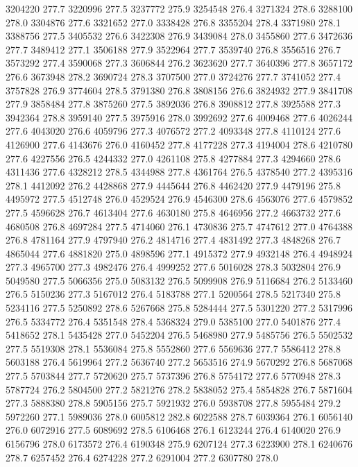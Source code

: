 3204220 277.7
3220996 277.5
3237772 275.9
3254548 276.4
3271324 278.6
3288100 278.0
3304876 277.6
3321652 277.0
3338428 276.8
3355204 278.4
3371980 278.1
3388756 277.5
3405532 276.6
3422308 276.9
3439084 278.0
3455860 277.6
3472636 277.7
3489412 277.1
3506188 277.9
3522964 277.7
3539740 276.8
3556516 276.7
3573292 277.4
3590068 277.3
3606844 276.2
3623620 277.7
3640396 277.8
3657172 276.6
3673948 278.2
3690724 278.3
3707500 277.0
3724276 277.7
3741052 277.4
3757828 276.9
3774604 278.5
3791380 276.8
3808156 276.6
3824932 277.9
3841708 277.9
3858484 277.8
3875260 277.5
3892036 276.8
3908812 277.8
3925588 277.3
3942364 278.8
3959140 277.5
3975916 278.0
3992692 277.6
4009468 277.6
4026244 277.6
4043020 276.6
4059796 277.3
4076572 277.2
4093348 277.8
4110124 277.6
4126900 277.6
4143676 276.0
4160452 277.8
4177228 277.3
4194004 278.6
4210780 277.6
4227556 276.5
4244332 277.0
4261108 275.8
4277884 277.3
4294660 278.6
4311436 277.6
4328212 278.5
4344988 277.8
4361764 276.5
4378540 277.2
4395316 278.1
4412092 276.2
4428868 277.9
4445644 276.8
4462420 277.9
4479196 275.8
4495972 277.5
4512748 276.0
4529524 276.9
4546300 278.6
4563076 277.6
4579852 277.5
4596628 276.7
4613404 277.6
4630180 275.8
4646956 277.2
4663732 277.6
4680508 276.8
4697284 277.5
4714060 276.1
4730836 275.7
4747612 277.0
4764388 276.8
4781164 277.9
4797940 276.2
4814716 277.4
4831492 277.3
4848268 276.7
4865044 277.6
4881820 275.0
4898596 277.1
4915372 277.9
4932148 276.4
4948924 277.3
4965700 277.3
4982476 276.4
4999252 277.6
5016028 278.3
5032804 276.9
5049580 277.5
5066356 275.0
5083132 276.5
5099908 276.9
5116684 276.2
5133460 276.5
5150236 277.3
5167012 276.4
5183788 277.1
5200564 278.5
5217340 275.8
5234116 277.5
5250892 278.6
5267668 275.8
5284444 277.5
5301220 277.2
5317996 276.5
5334772 276.4
5351548 278.4
5368324 279.0
5385100 277.0
5401876 277.4
5418652 278.1
5435428 277.0
5452204 276.5
5468980 277.9
5485756 276.5
5502532 277.5
5519308 278.1
5536084 275.8
5552860 277.6
5569636 277.7
5586412 278.8
5603188 276.4
5619964 277.2
5636740 277.2
5653516 274.9
5670292 276.8
5687068 277.5
5703844 277.7
5720620 275.7
5737396 276.8
5754172 277.6
5770948 278.3
5787724 276.2
5804500 277.2
5821276 278.2
5838052 275.4
5854828 276.7
5871604 277.3
5888380 278.8
5905156 275.7
5921932 276.0
5938708 277.8
5955484 279.2
5972260 277.1
5989036 278.0
6005812 282.8
6022588 278.7
6039364 276.1
6056140 276.0
6072916 277.5
6089692 278.5
6106468 276.1
6123244 276.4
6140020 276.9
6156796 278.0
6173572 276.4
6190348 275.9
6207124 277.3
6223900 278.1
6240676 278.7
6257452 276.4
6274228 277.2
6291004 277.2
6307780 278.0
